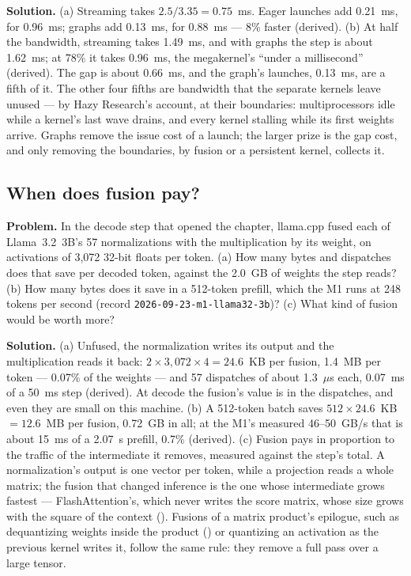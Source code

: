 \textbf{Solution.} (a) Streaming takes $2.5 / 3.35 = 0.75$~ms. Eager launches add
0.21~ms, for 0.96~ms; graphs add 0.13~ms, for 0.88~ms --- 8\% faster (derived).
(b) At half the bandwidth, streaming takes 1.49~ms, and with graphs the step is
about 1.62~ms; at 78\% it takes 0.96~ms, the megakernel's ``under a
millisecond'' (derived). The gap is about 0.66~ms, and the graph's launches,
0.13~ms, are a fifth of it. The other four fifths are bandwidth that the
separate kernels leave unused --- by Hazy Research's account, at their
boundaries: multiprocessors idle while a kernel's last wave drains, and every
kernel stalling while its first weights arrive. Graphs remove the issue cost
of a launch; the larger prize is the gap cost, and only removing the
boundaries, by fusion or a persistent kernel, collects it.

\subsection{When does fusion pay?}
\textbf{Problem.} In the decode step that opened the chapter, llama.cpp fused
each of Llama~3.2~3B's 57 normalizations with the multiplication by its weight,
on activations of 3,072 32-bit floats per token. (a) How many bytes and
dispatches does that save per decoded token, against the 2.0~GB of weights the
step reads? (b) How many bytes does it save in a 512-token prefill, which the
M1 runs at 248 tokens per second (record \texttt{2026-09-23-m1-llama32-3b})? (c)
What kind of fusion would be worth more?

\textbf{Solution.} (a) Unfused, the normalization writes its output and the
multiplication reads it back: $2 \times 3{,}072 \times 4 = 24.6$~KB per
fusion, 1.4~MB per token --- 0.07\% of the weights --- and 57 dispatches of
about 1.3~$\mu$s each, 0.07~ms of a 50~ms step (derived). At decode the
fusion's value is in the dispatches, and even they are small on this machine.
(b) A 512-token batch saves $512 \times 24.6$~KB $= 12.6$~MB per fusion,
0.72~GB in all; at the M1's measured 46--50~GB/s that is about 15~ms of a
2.07~s prefill, 0.7\% (derived). (c) Fusion pays in proportion to the traffic
of the intermediate it removes, measured against the step's total. A
normalization's output is one vector per token, while a projection reads a
whole matrix; the fusion that changed inference is the one whose intermediate
grows fastest --- FlashAttention's, which never writes the score matrix, whose
size grows with the square of the context (). Fusions of
a matrix product's epilogue, such as dequantizing weights inside the product
() or quantizing an activation as the previous
kernel writes it, follow the same rule: they remove a full pass over a large
tensor.
